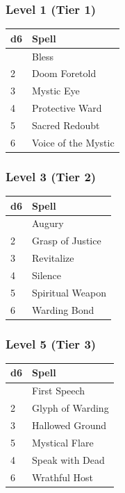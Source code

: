 \documentclass[12pt,letterpaper,twocolumn,openany,nodeprecatedcode,bg=none]{dndbook}
\begin{document}
\subsubsection{Level 1 (Tier 1)}\label{level-1-tier-1}

\begin{longtable}[]{@{}ll@{}}
\toprule\noalign{}
d6 & Spell \\
\midrule\noalign{}
\endhead
\bottomrule\noalign{}
\endlastfoot
1 & Bless \\
2 & Doom Foretold \\
3 & Mystic Eye \\
4 & Protective Ward \\
5 & Sacred Redoubt \\
6 & Voice of the Mystic \\
\end{longtable}

\subsubsection{Level 3 (Tier 2)}\label{level-3-tier-2}

\begin{longtable}[]{@{}ll@{}}
\toprule\noalign{}
d6 & Spell \\
\midrule\noalign{}
\endhead
\bottomrule\noalign{}
\endlastfoot
1 & Augury \\
2 & Grasp of Justice \\
3 & Revitalize \\
4 & Silence \\
5 & Spiritual Weapon \\
6 & Warding Bond \\
\end{longtable}

\subsubsection{Level 5 (Tier 3)}\label{level-5-tier-3}

\begin{longtable}[]{@{}ll@{}}
\toprule\noalign{}
d6 & Spell \\
\midrule\noalign{}
\endhead
\bottomrule\noalign{}
\endlastfoot
1 & First Speech \\
2 & Glyph of Warding \\
3 & Hallowed Ground \\
5 & Mystical Flare \\
4 & Speak with Dead \\
6 & Wrathful Host \\
\end{longtable}
\end{document}
